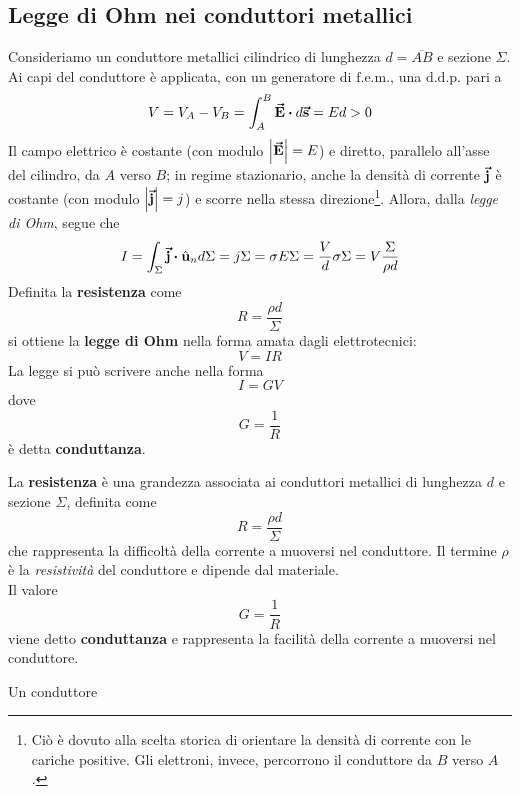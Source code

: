 \subsection{Legge di Ohm nei conduttori metallici}
Consideriamo un conduttore metallici cilindrico di lunghezza $d=\overline{AB}$ e sezione $\Sigma$. Ai capi del conduttore è applicata, con un generatore di $\mathrm{f.e.m.}$, una $\mathrm{d.d.p.}$ pari a
\begin{equation*}
	V=V_A-V_B=\int_{A}^{B}\vba{E}\vdot d\vba{s}=Ed>0
\end{equation*}
Il campo elettrico è costante (con modulo $\abs{\vb*{\va{E}}}=E$) e diretto, parallelo all'asse del cilindro, da $A$ verso $B$; in regime stazionario, anche la densità di corrente $\vb*{\va{j}}$ è costante (con modulo $\abs{\vb*{\va{j}}}=j$) e scorre nella stessa direzione\footnote{Ciò è dovuto alla scelta storica di orientare la densità di corrente con le cariche positive. Gli elettroni, invece, percorrono il conduttore da $B$ verso $A$.}. Allora, dalla \textit{legge di Ohm}, segue che
\begin{equation*}
	I=\int_{\Sigma}\vba{j}\vdot\vbh{u}_nd\Sigma=j\Sigma=\sigma E\Sigma=\frac{V}{d}\sigma\Sigma=V\frac{\Sigma}{\rho d}
\end{equation*}
Definita la \textbf{resistenza} come
\begin{equation*}
	R=\frac{\rho d}{\Sigma}
\end{equation*}
si ottiene la \textbf{legge di Ohm} nella forma amata dagli elettrotecnici:
\begin{equation}
	V=IR
\end{equation}
La legge si può scrivere anche nella forma
\begin{equation}
	I=GV
\end{equation}
dove
\begin{equation*}
	G=\frac{1}{R}
\end{equation*}
è detta \textbf{conduttanza}.
\begin{define}
	La \textbf{resistenza} è una grandezza associata ai conduttori metallici di lunghezza $d$ e sezione $\Sigma$, definita come
	\begin{equation*}
		R=\frac{\rho d}{\Sigma}
	\end{equation*}
	che rappresenta la difficoltà della corrente a muoversi nel conduttore. Il termine $\rho$ è la \textit{resistività} del conduttore e dipende dal materiale.\\
	Il valore
	\begin{equation}
		G=\frac{1}{R}
	\end{equation}
	viene detto \textbf{conduttanza} e rappresenta la facilità della corrente a muoversi nel conduttore.
\end{define}
Un conduttore 
